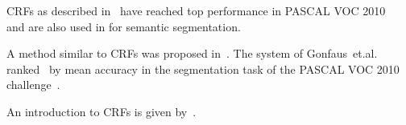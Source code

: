 \Glspl{CRF} as described in~\cite{associative09} have reached top performance
in PASCAL VOC 2010~\cite{VOC2010Results} and are also used in
\cite{multiscale04,shotton2006textonboost} for semantic segmentation.

A method similar to \glspl{CRF} was proposed in~\cite{gonfaus2010harmony}.
The system of Gonfaus~et.al. ranked~ by mean accuracy in the segmentation
task of the PASCAL VOC 2010 challenge~\cite{everingham2010pascal}.

An introduction to \glspl{CRF} is given by~\cite{sutton2011introduction}.

